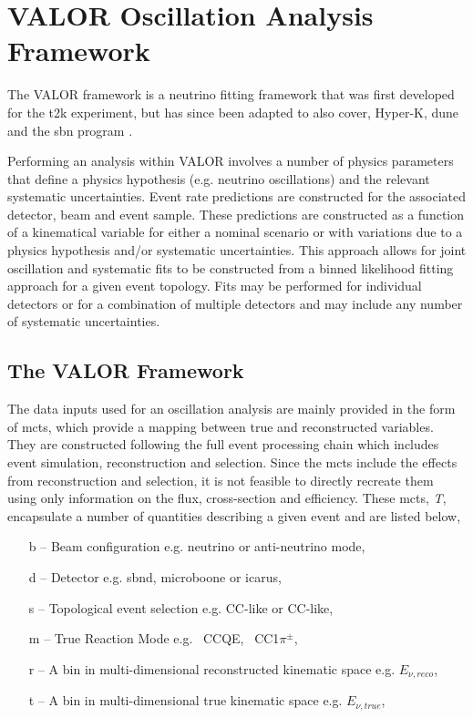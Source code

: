 \chapter{VALOR Oscillation Analysis Framework}
\label{chap:VALOR}

The VALOR framework is a neutrino fitting framework that was first developed for the \gls{t2k} experiment, but has since been adapted to also cover, Hyper-K, \gls{dune} and the \gls{sbn} program \cite{VALOR}.

Performing an analysis within VALOR involves a number of physics parameters that define a physics hypothesis (e.g. neutrino oscillations) and the relevant systematic uncertainties. Event rate predictions are constructed for the associated detector, beam and event sample. These predictions are constructed as a function of a kinematical variable for either a nominal scenario or with variations due to a physics hypothesis and/or systematic uncertainties. This approach allows for joint oscillation and systematic fits to be constructed from a binned likelihood fitting approach for a given event topology. Fits may be performed for individual detectors or for a combination of multiple detectors and may include any number of systematic uncertainties. 

\section{The VALOR Framework}\label{sec:VALOR_framework}

The data inputs used for an oscillation analysis are mainly provided in the form of \glspl{mct}, which provide a mapping between true and reconstructed variables. They are constructed following the full event processing chain which includes event simulation, reconstruction and selection. Since the \glspl{mct} include the effects from reconstruction and selection, it is not feasible to directly recreate them using only information on the flux, cross-section and efficiency. These \glspl{mct}, \textit{T}, encapsulate a number of quantities describing a given event and are listed below,

\begin{itemize}
    \item[b] -- Beam configuration e.g. neutrino or anti-neutrino mode,
    \item[d] -- Detector e.g. \gls{sbnd}, \gls{microboone} or \gls{icarus},
    \item[s] -- Topological event selection e.g. \nue CC-like or \numu CC-like,
    \item[m] -- True Reaction Mode e.g. \numu~CCQE, \nue~CC1$\pi^{\pm}$,
    \item[r] -- A bin in multi-dimensional reconstructed kinematic space e.g. $E_{\nu, reco}$,
    \item[t] -- A bin in multi-dimensional true kinematic space e.g. $E_{\nu, true}$,
\end{itemize}

